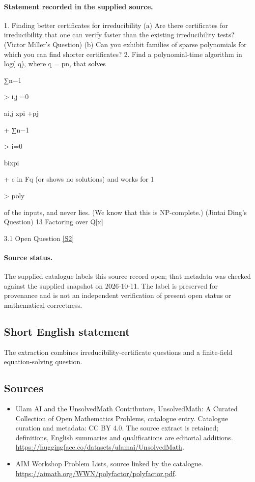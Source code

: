 \documentclass[11pt]{article}
\begin{document}
\paragraph{Statement recorded in the supplied source.}
1. Finding better certificates for irreducibility (a) Are there certificates for irreducibility that one can verify faster than the existing irreducibility tests? (Victor Miller's Question) (b) Can you exhibit families of sparse polynomials for which you can find shorter certificates? 2. Find a polynomial-time algorithm in log( q), where q = pn, that solves

∑n−1

> i,j =0

ai,j xpi +pj

+ ∑n−1

> i=0

bixpi

+ c in Fq (or shows no solutions) and works for 1

> poly

of the inputs, and never lies. (We know that this is NP-complete.) (Jintai Ding's Question) 13 Factoring over Q[x]

3.1 Open
Question \href{https://aimath.org/WWN/polyfactor/polyfactor.pdf}{[S2]}
\paragraph{Source status.}
The supplied catalogue labels this source record open; that metadata was checked against the supplied snapshot on 2026-10-11. The label is preserved for provenance and is not an independent verification of present open status or mathematical correctness.
\subsection{Short English statement}
The extraction combines irreducibility-certificate questions and a finite-field equation-solving question.
\subsection{Sources}
\begin{itemize}
\item[S1] Ulam AI and the UnsolvedMath Contributors, UnsolvedMath: A Curated Collection of Open Mathematics Problems, catalogue entry. Catalogue curation and metadata: CC BY 4.0. The source extract is retained; definitions, English summaries and qualifications are editorial additions.
\url{https://huggingface.co/datasets/ulamai/UnsolvedMath}.
\item[S2] AIM Workshop Problem Lists, source linked by the catalogue.
\url{https://aimath.org/WWN/polyfactor/polyfactor.pdf}.
\end{itemize}
\end{document}
